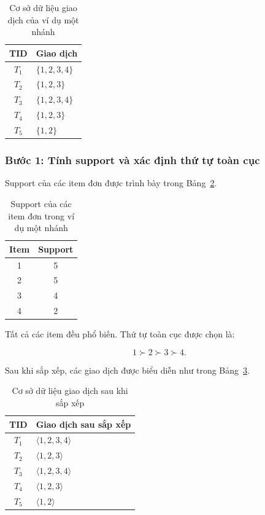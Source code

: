 \begin{table}[H]
\centering
\caption{Cơ sở dữ liệu giao dịch của ví dụ một nhánh}
\label{tab:special-tdb}
\begin{tabular}{cl}
\toprule
TID & Giao dịch \\
\midrule
$T_1$ & $\{1,2,3,4\}$ \\
$T_2$ & $\{1,2,3\}$ \\
$T_3$ & $\{1,2,3,4\}$ \\
$T_4$ & $\{1,2,3\}$ \\
$T_5$ & $\{1,2\}$ \\
\bottomrule
\end{tabular}
\end{table}

\subsubsection{Bước 1: Tính support và xác định thứ tự toàn cục}

Support của các item đơn được trình bày trong Bảng~\ref{tab:special-single-support}.

\begin{table}[H]
\centering
\caption{Support của các item đơn trong ví dụ một nhánh}
\label{tab:special-single-support}
\begin{tabular}{cc}
\toprule
Item & Support \\
\midrule
1 & 5 \\
2 & 5 \\
3 & 4 \\
4 & 2 \\
\bottomrule
\end{tabular}
\end{table}

Tất cả các item đều phổ biến. Thứ tự toàn cục được chọn là:

\begin{equation}
    1\succ2\succ3\succ4.
    \label{eq:special-global-order}
\end{equation}

Sau khi sắp xếp, các giao dịch được biểu diễn như trong Bảng~\ref{tab:special-sorted-tdb}.

\begin{table}[H]
\centering
\caption{Cơ sở dữ liệu giao dịch sau khi sắp xếp}
\label{tab:special-sorted-tdb}
\begin{tabular}{cl}
\toprule
TID & Giao dịch sau sắp xếp \\
\midrule
$T_1$ & $\langle1,2,3,4\rangle$ \\
$T_2$ & $\langle1,2,3\rangle$ \\
$T_3$ & $\langle1,2,3,4\rangle$ \\
$T_4$ & $\langle1,2,3\rangle$ \\
$T_5$ & $\langle1,2\rangle$ \\
\bottomrule
\end{tabular}
\end{table}

